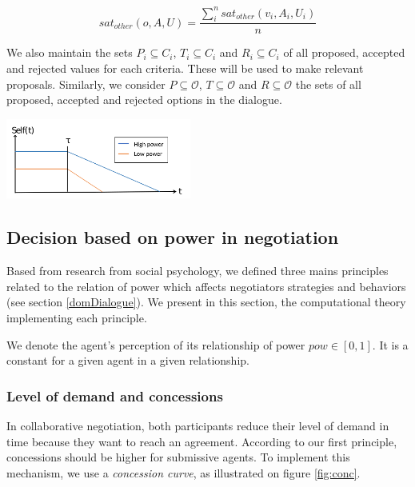 \documentclass{llncs}
\begin{document}
	\begin{equation}
	sat_{other}(o, A, U) = \frac{ \sum_{i}^{n} sat_{other}(v_i, A_i, U_i) } {n}
	\end{equation}
	
	We also maintain the sets $P_i \subseteq C_i$, $T_i\subseteq C_i$ and $R_i\subseteq C_i$ of all proposed, accepted and rejected values for each criteria. These will be used to make relevant proposals. Similarly, we consider $P\subseteq \mathcal{O}$, $T\subseteq \mathcal{O}$ and $R\subseteq \mathcal{O}$ the sets of all proposed, accepted and rejected options in the dialogue.
	
	\begin{floatingfigure}[l]{2.5in}
		\includegraphics[width=2.4in]{graphs/s3.png}
	\end{floatingfigure} 

	
	\subsection{Decision based on power in negotiation}

		
	\label{sec:decision}
	Based from research from social psychology, we defined three mains principles related to the relation of power which affects negotiators strategies and behaviors (see section \ref{domDialogue}). We present in this section, the computational theory implementing each principle. 
	
		We denote the agent's perception of its relationship of power $pow \in [0, 1] $. It is a constant for a given agent in a given relationship.
		
	
	\subsubsection{Level of demand and concessions}
	In collaborative negotiation, both participants reduce their level of demand in time because they want to reach an agreement. According to our first principle, concessions should be higher for submissive agents. To implement this mechanism, we use a \emph{concession curve}, as illustrated on figure \ref{fig:conc}.
	
\end{document}
